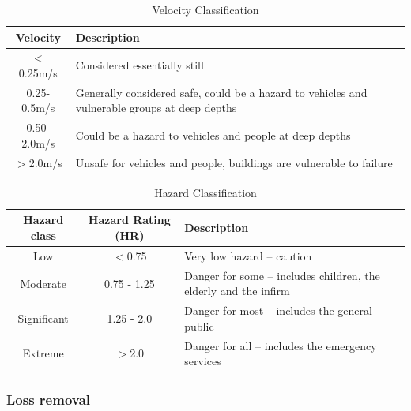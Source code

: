 \documentclass[APA,Times2COL]{WileyNJDv5}
\begin{document}
\setlength{\tabcolsep}{10pt} %
\renewcommand{\arraystretch}{1.5} %
\begin{table}[h!]
\centering
\caption{Velocity Classification \citep{environment2019risk}}
\begin{tabular}{c C{13cm}} 
 \hline
 \textbf{Velocity} & \textbf{Description} \\ [0.5ex] 
  \hline
 $<$0.25m/s & Considered essentially still \\
 0.25-0.5m/s & Generally considered safe, could be a hazard to vehicles and vulnerable 
groups at deep depths \\
 0.50-2.0m/s & Could be a hazard to vehicles and people at deep depths\\
 $>$2.0m/s & Unsafe for vehicles and people, buildings are vulnerable to failure\\[1ex] 
 \hline
\end{tabular}
\label{table:velocity_cats}
\end{table}

\setlength{\tabcolsep}{10pt} %
\renewcommand{\arraystretch}{1.5} %
\begin{table}[h!]
\centering
\caption{Hazard Classification }
\begin{tabular}{c c p{10cm}} 
 \hline
 \textbf{Hazard class} & \textbf{Hazard Rating (HR)} & \textbf{Description} \\ [0.5ex] 
 \hline
 Low & $<$0.75 & Very low hazard – caution \\
 Moderate & 0.75 - 1.25 & Danger for some – includes children, the elderly and the infirm\\
 Significant & 1.25 - 2.0 & Danger for most – includes the general public \\
 Extreme & $>$2.0 & Danger for all – includes the emergency services \\
 \hline
\end{tabular}
\label{table:hazard_cats}
\end{table}
\endgroup

\subsubsection{Loss removal}
\end{document}

